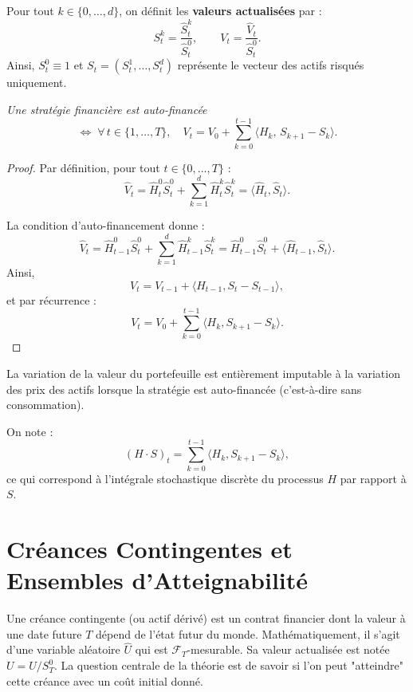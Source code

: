 \begin{definition}
Pour tout $k\in\{0,\ldots,d\}$, on définit les \textbf{valeurs actualisées} par :
\[
S_t^k = \frac{\hat S_t^k}{\hat S_t^0}, \qquad V_t = \frac{\hat V_t}{\hat S_t^0}.
\]
Ainsi, $S_t^0 \equiv 1$ et $S_t = (S_t^1,\ldots,S_t^d)$ représente le vecteur des actifs risqués uniquement.
\end{definition}

\begin{lemme}

\emph{Une stratégie financière est auto-financée}
\[
\Longleftrightarrow\;
\forall\, t \in \{1,\ldots,T\},\quad
V_t = V_0 + \sum_{k=0}^{t-1} \langle H_k,\, S_{k+1} - S_k \rangle.
\]
\end{lemme}



\begin{proof}
Par définition, pour tout $t\in\{0,\ldots,T\}$ :
\[
\hat V_t = \hat H_t^0 \hat S_t^0 + \sum_{k=1}^d \hat H_t^k \hat S_t^k = \langle \hat H_t, \hat S_t \rangle.
\]

La condition d'auto-financement donne :
\[
\hat V_t = \hat H_{t-1}^0 \hat S_t^0 + \sum_{k=1}^d \hat H_{t-1}^k \hat S_t^k = \hat H_{t-1}^0 \hat S_t^0 + \langle \hat H_{t-1}, \hat S_t \rangle.
\]
Ainsi,
\[
V_t = V_{t-1} + \langle H_{t-1}, S_t - S_{t-1} \rangle,
\]
et par récurrence :
\[
V_t = V_0 + \sum_{k=0}^{t-1} \langle H_k, S_{k+1} - S_k \rangle.
\]
\end{proof}

\begin{remarque}
La variation de la valeur du portefeuille est entièrement imputable à la variation des prix des actifs lorsque la stratégie est auto-financée (c'est-à-dire sans consommation).
\end{remarque}

\begin{remarque}
On note :
\[
(H \cdot S)_t = \sum_{k=0}^{t-1} \langle H_k, S_{k+1} - S_k \rangle,
\]
ce qui correspond à l'intégrale stochastique discrète du processus $H$ par rapport à $S$.
\end{remarque}


\section{Créances Contingentes et Ensembles d'Atteignabilité}

Une créance contingente (ou actif dérivé) est un contrat financier dont la valeur à une date future $T$ dépend de l'état futur du monde. Mathématiquement, il s'agit d'une variable aléatoire $\hat{U}$ qui est $\mathcal{F}_T$-mesurable. Sa valeur actualisée est notée $U = \hat{U} / S^0_T$. La question centrale de la théorie est de savoir si l'on peut "atteindre" cette créance avec un coût initial donné.

